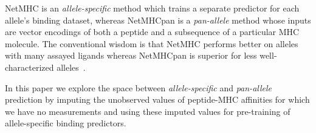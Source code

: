 

NetMHC is an {\it allele-specific} method which trains a separate predictor for each allele's binding dataset, whereas NetMHCpan is a {\it pan-allele} method whose inputs are vector encodings of both a peptide and a subsequence of a particular MHC molecule. The conventional wisdom is that NetMHC performs better on alleles with many assayed ligands whereas NetMHCpan is superior for less well-characterized alleles~\cite{Gfeller_2016}.

In this paper we explore the space between {\it allele-specific} and {\it pan-allele} prediction by imputing the unobserved values of peptide-MHC affinities for which we have no measurements and using these imputed values for pre-training of allele-specific binding predictors.

